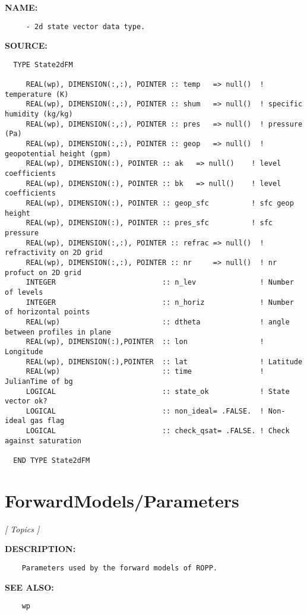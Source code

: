 \label{ch:robo39}
\label{ch:Datatypes_State2dFM}
\textbf{NAME:}\hspace{0.08in}\begin{Verbatim}
     - 2d state vector data type.
\end{Verbatim}
\textbf{SOURCE:}\hspace{0.08in}\begin{Verbatim}
  TYPE State2dFM

     REAL(wp), DIMENSION(:,:), POINTER :: temp   => null()  ! temperature (K)
     REAL(wp), DIMENSION(:,:), POINTER :: shum   => null()  ! specific humidity (kg/kg)
     REAL(wp), DIMENSION(:,:), POINTER :: pres   => null()  ! pressure (Pa)
     REAL(wp), DIMENSION(:,:), POINTER :: geop   => null()  ! geopotential height (gpm)
     REAL(wp), DIMENSION(:), POINTER :: ak   => null()    ! level coefficients
     REAL(wp), DIMENSION(:), POINTER :: bk   => null()    ! level coefficients
     REAL(wp), DIMENSION(:), POINTER :: geop_sfc          ! sfc geop height
     REAL(wp), DIMENSION(:), POINTER :: pres_sfc          ! sfc pressure
     REAL(wp), DIMENSION(:,:), POINTER :: refrac => null()  ! refractivity on 2D grid
     REAL(wp), DIMENSION(:,:), POINTER :: nr     => null()  ! nr profuct on 2D grid
     INTEGER                         :: n_lev               ! Number of levels
     INTEGER                         :: n_horiz             ! Number of horizontal points
     REAL(wp)                        :: dtheta              ! angle between profiles in plane
     REAL(wp), DIMENSION(:),POINTER  :: lon                 ! Longitude
     REAL(wp), DIMENSION(:),POINTER  :: lat                 ! Latitude
     REAL(wp)                        :: time                ! JulianTime of bg
     LOGICAL                         :: state_ok            ! State vector ok?
     LOGICAL                         :: non_ideal= .FALSE.  ! Non-ideal gas flag
     LOGICAL                         :: check_qsat= .FALSE. ! Check against saturation

  END TYPE State2dFM
\end{Verbatim}
\section{ForwardModels/Parameters}
\textsl{[ Topics ]}

\label{ch:robo45}
\label{ch:ForwardModels_Parameters}
\textbf{DESCRIPTION:}\hspace{0.08in}\begin{Verbatim}
    Parameters used by the forward models of ROPP.
\end{Verbatim}
\textbf{SEE ALSO:}\hspace{0.08in}\begin{Verbatim}
    wp
\end{Verbatim}

